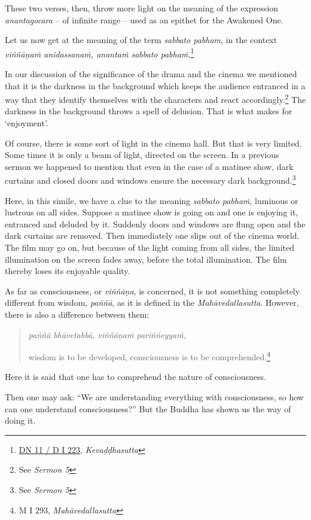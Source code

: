These two verses, then, throw more light on the meaning of the expression \emph{anantagocara} -- of infinite range -- used as an epithet for the Awakened One.

Let us now get at the meaning of the term \emph{sabbato pabham}, in the context \emph{viññāṇaṁ anidassanaṁ, anantaṁ sabbato pabhaṁ.}\footnote{\href{https://suttacentral.net/dn11/pli/ms}{DN 11 / D I 223}, \emph{Kevaḍḍhasutta}}

In our discussion of the significance of the drama and the cinema we mentioned that it is the darkness in the background which keeps the audience entranced in a way that they identify themselves with the characters and react accordingly.\footnote{See \emph{Sermon 5}} The darkness in the background throws a spell of delusion. That is what makes for `enjoyment'.

Of course, there is some sort of light in the cinema hall. But that is very limited. Some times it is only a beam of light, directed on the screen. In a previous sermon we happened to mention that even in the case of a matinee show, dark curtains and closed doors and windows ensure the necessary dark background.\footnote{See \emph{Sermon 5}}

Here, in this simile, we have a clue to the meaning \emph{sabbato pabhaṁ}, luminous or lustrous on all sides. Suppose a matinee show is going on and one is enjoying it, entranced and deluded by it. Suddenly doors and windows are flung open and the dark curtains are removed. Then immediately one slips out of the cinema world. The film may go on, but because of the light coming from all sides, the limited illumination on the screen fades away, before the total illumination. The film thereby loses its enjoyable quality.

As far as consciousness, or \emph{viññāṇa}, is concerned, it is not something completely different from wisdom, \emph{paññā}, as it is defined in the \emph{Mahāvedallasutta}. However, there is also a difference between them:

\begin{quote}
\emph{paññā bhāvetabbā, viññāṇaṁ pariññeyyaṁ,}

wisdom is to be developed, consciousness is to be comprehended.\footnote{M I 293, \emph{Mahāvedallasutta}}
\end{quote}

Here it is said that one has to comprehend the nature of consciousness.

Then one may ask: ``We are understanding everything with consciousness, so how can one understand consciousness?'' But the Buddha has shown us the way of doing it.

